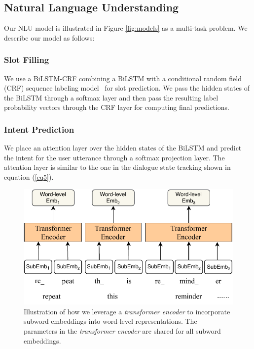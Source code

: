 \documentclass[letterpaper]{article}
\begin{document}
\subsection{Natural Language Understanding}
Our NLU model is illustrated in Figure \ref{fig:models} as a multi-task problem. We describe our model as follows:

\subsubsection{Slot Filling}
We use a BiLSTM-CRF combining a BiLSTM with a conditional random field (CRF) sequence labeling model~\cite{lample2016neural} for slot prediction. We pass the hidden states of the BiLSTM through a softmax layer and then pass the resulting label probability vectors through the CRF layer for computing final predictions.

\subsubsection{Intent Prediction}
We place an attention layer over the hidden states of the BiLSTM and predict the intent for the user utterance through a softmax projection layer. The attention layer is similar to the one in the dialogue state tracking shown in equation (\ref{eq5}).

\begin{figure}
    \centering
    \includegraphics[scale=0.67]{subword2word.pdf}
    \caption{Illustration of how we leverage a \textit{transformer encoder} to incorporate subword embeddings into word-level representations. The parameters in the \textit{transformer encoder} are shared for all subword embeddings.}
    \label{fig:subword2word}
\end{figure}
\end{document}
